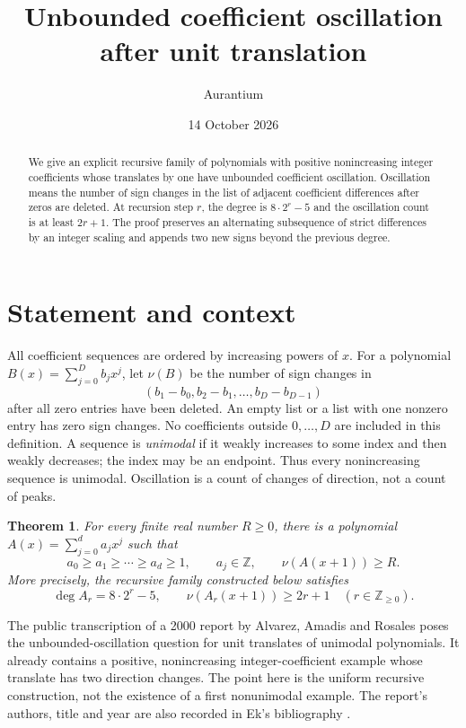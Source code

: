\documentclass[11pt]{article}
\title{Unbounded coefficient oscillation\protect\\ after unit translation}
\author{Aurantium}
\date{14 October 2026}
\newtheorem{theorem}{Theorem}
\newcommand{\Z}{\mathbb Z}
\begin{document}
\maketitle

\begin{abstract}
We give an explicit recursive family of polynomials with positive
nonincreasing integer coefficients whose translates by one have unbounded
coefficient oscillation. Oscillation means the number of sign changes in
the list of adjacent coefficient differences after zeros are deleted.
At recursion step $r$, the degree is $8\cdot2^r-5$ and the oscillation
count is at least $2r+1$. The proof preserves an alternating subsequence
of strict differences by an integer scaling and appends two new signs
beyond the previous degree.
\end{abstract}

\section{Statement and context}

All coefficient sequences are ordered by increasing powers of $x$.
For a polynomial $B(x)=\sum_{j=0}^{D}b_jx^j$, let $\nu(B)$ be the
number of sign changes in
\[
 (b_1-b_0,b_2-b_1,\ldots,b_D-b_{D-1})
\]
after all zero entries have been deleted. An empty list or a list with
one nonzero entry has zero sign changes. No coefficients outside
$0,\ldots,D$ are included in this definition.
A sequence is \emph{unimodal} if it weakly increases to some index and
then weakly decreases; the index may be an endpoint. Thus every
nonincreasing sequence is unimodal. Oscillation is a count of changes
of direction, not a count of peaks.

\begin{theorem}\label{thm:main}
For every finite real number $R\geq0$, there is a polynomial
$A(x)=\sum_{j=0}^{d}a_jx^j$ such that
\[
 a_0\geq a_1\geq\cdots\geq a_d\geq1,
 \qquad a_j\in\Z,
 \qquad \nu(A(x+1))\geq R.
\]
More precisely, the recursive family constructed below satisfies
\begin{equation}\label{eq:bounds}
 \deg A_r=8\cdot2^r-5,
 \qquad \nu(A_r(x+1))\geq2r+1
 \quad(r\in\Z_{\geq0}).
\end{equation}
\end{theorem}

The public transcription of a 2000 report by Alvarez, Amadis and
Rosales \cite{AAR} poses the unbounded-oscillation question for unit
translates of unimodal polynomials. It already contains a positive,
nonincreasing integer-coefficient example whose translate has two
direction changes. The point here is the uniform recursive construction,
not the existence of a first nonunimodal example. The report's authors,
title and year are also recorded in Ek's bibliography \cite{Ek}.
\end{document}
